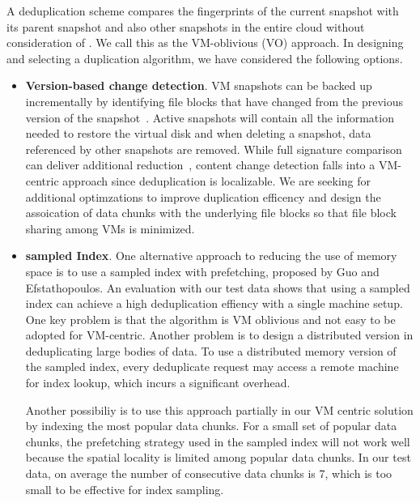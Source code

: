 A deduplication scheme compares the fingerprints of the current snapshot
with its parent snapshot and also other snapshots in the entire cloud without consideration of .
We call this as  the VM-oblivious (VO) approach.
In designing and selecting a duplication algorithm, we have considered the following options.
\begin{itemize}
\item {\bf Version-based change detection}.
VM snapshots can be  backed up  incrementally by identifying file  blocks that have
changed from the previous version of the snapshot~\cite{Clements2009,Vrable2009,TanIPDPS2011}.
Active snapshots will contain all the information needed to restore the virtual disk
and when deleting a snapshot, data referenced by other snapshots are removed.
While full signature comparison can deliver additional reduction~\cite{Guo2011,Dong,ExtremeBining},
content change detection falls into a VM-centric approach since deduplication is localizable. 
We are seeking for additional optimzations to improve duplication efficency and design the 
assoication of data chunks with the underlying file blocks so that
file block sharing among VMs is minimized.
\item {\bf sampled Index}.
One alternative approach to reducing the use of memory space is 
to use a sampled index with prefetching, proposed  by Guo and Efstathopoulos\cite{Guo2011}. 
An evaluation with our test data shows that using a sampled index can achieve a high
deduplication effiency with a single machine setup.  
One key problem is that the algorithm is VM oblivious and not easy to be adopted for VM-centric.
Another problem is  to design a distributed version 
in deduplicating large bodies of data. 
To use a distributed memory version of the sampled index, every deduplicate request
may access a remote machine for index lookup,  which  incurs a significant overhead.


Another possibiliy is to use this approach partially  in our VM centric solution by indexing
the most popular data chunks. For a small set of popular data chunks, the prefetching strategy
used in the sampled index will not work well because the spatial locality is limited among popular 
data chunks. In our test data,  on average the number of consecutive data chunks is 7, which is too small
to be effective for index sampling. 


\end{itemize}
